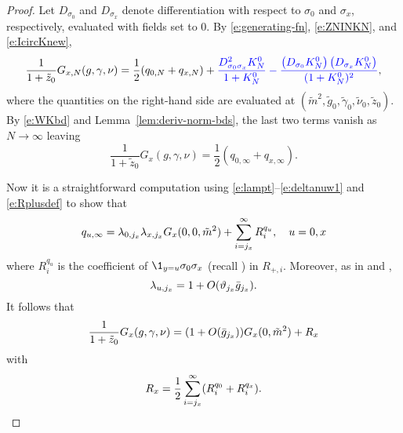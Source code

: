\begin{proof}
Let $D_{\sigma_0}$ and $D_{\sigma_x}$ denote differentiation with respect to
$\sigma_0$ and $\sigma_x$, respectively, evaluated with  fields set to $0$.
By \eqref{e:generating-fn}, \eqref{e:ZNINKN}, and \eqref{e:IcircKnew},
\begin{equation}
\lbeq{GK}
\frac{1}{1+\tilde z_0} G_{x,N}(g,\gamma,\nu)
	=
\frac{1}{2} (q_{0,N} + q_{x,N})
	+
\new{
\frac{D^2_{\sigma_0\sigma_x}K^0_{N}}{1 + K^0_{N}}
	-
\frac{\left(D_{\sigma_0}K^0_{N}\right) \left(D_{\sigma_x}K^0_{N}\right)}{(1 + K^0_{N})^2}},
\end{equation}
where the quantities on the right-hand side are evaluated at
$(\tilde m^2, \tilde g_0, \tilde\gamma_0, \tilde\nu_0, \tilde z_0)$.
By \eqref{e:WKbd} and Lemma~\ref{lem:deriv-norm-bds}, the last two terms
vanish as $N \to \infty$ leaving
\begin{equation}
\frac{1}{1+\tilde z_0} G_x(g, \gamma, \nu) = \frac{1}{2} (q_{0,\infty} + q_{x,\infty}).
\end{equation}

Now it is a straightforward computation using \eqref{e:lampt}--\eqref{e:deltanuw1}
and \eqref{e:Rplusdef} to show that
\begin{equation}
\label{e:q}
q_{u,\infty}
	=
\lambda_{0, j_x} \lambda_{x, j_x}  G_x(0, 0, \tilde m^2)
	+
\sum_{i = j_x}^\infty R^{q_u}_i,
\quad u = 0, x
\end{equation}
where $R^{q_u}_i$ is the coefficient of $\1_{y=u}\sigma_0\sigma_x$
(recall ) in $R_{+,i}$.
Moreover, as in \cite[\eqref{phi4-e:lam-star}]{ST-phi4} and \cite[Corollary~\ref{phi4-cor:vx}]{ST-phi4},
\begin{equation}
\lambda_{u,j_x} = 1 + O(\vartheta_{j_x} \bar{g}_{j_x}).
\end{equation}
It follows that
\begin{equation}
\frac{1}{1+\tilde z_0} G_x(g, \gamma, \nu)
	=
(1 + O(\bar{g}_{j_x})) G_x(0, \tilde m^2) + R_x
\end{equation}
with
\begin{equation}
\label{e:Rabdef}
R_x = \frac{1}{2} \sum_{i=j_x}^\infty (R^{q_0}_i + R^{q_x}_i).
\end{equation}


\end{proof}
